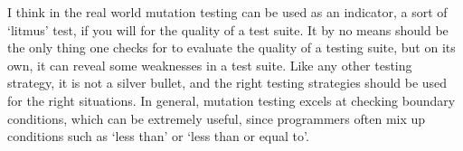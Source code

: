I think in the real world mutation testing can be used as an indicator, a sort
of `litmus' test, if you will for the quality of a test suite. It by no means
should be the only thing one checks for to evaluate the quality of a testing
suite, but on its own, it can reveal some weaknesses in a test suite. Like any
other testing strategy, it is not a silver bullet, and the right testing
strategies should be used for the right situations. In general, mutation testing
excels at checking boundary conditions, which can be extremely useful, since
programmers often mix up conditions such as `less than' or `less than or equal
to'.
